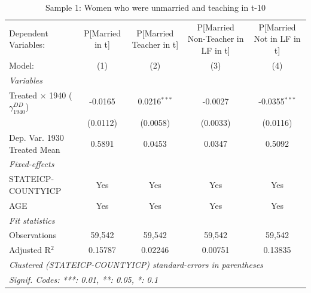 
\begin{table}[htbp]
   \caption{Sample 1: Women who were unmarried and teaching in t-10}
   \centering
   \begin{tabular}{lcccc}
      \tabularnewline \midrule \midrule
      Dependent Variables:                           & P[Married in t] & P[Married Teacher in t] & P[Married Non-Teacher in LF in t] & P[Married Not in LF in t]\\  
      Model:                                         & (1)             & (2)                     & (3)                               & (4)\\  
      \midrule
      \emph{Variables}\\
      Treated $\times$ 1940 ($\gamma_{1940}^{DD}$)   & -0.0165         & 0.0216$^{***}$          & -0.0027                           & -0.0355$^{***}$\\   
                                                     & (0.0112)        & (0.0058)                & (0.0033)                          & (0.0116)\\   
      Dep. Var. 1930 Treated Mean                    & 0.5891          & 0.0453                  & 0.0347                            & 0.5092\\  
      \midrule
      \emph{Fixed-effects}\\
      STATEICP-COUNTYICP                             & Yes             & Yes                     & Yes                               & Yes\\  
      AGE                                            & Yes             & Yes                     & Yes                               & Yes\\  
      \midrule
      \emph{Fit statistics}\\
      Observations                                   & 59,542          & 59,542                  & 59,542                            & 59,542\\  
      Adjusted R$^2$                                 & 0.15787         & 0.02246                 & 0.00751                           & 0.13835\\  
      \midrule \midrule
      \multicolumn{5}{l}{\emph{Clustered (STATEICP-COUNTYICP) standard-errors in parentheses}}\\
      \multicolumn{5}{l}{\emph{Signif. Codes: ***: 0.01, **: 0.05, *: 0.1}}\\
   \end{tabular}
\end{table}


